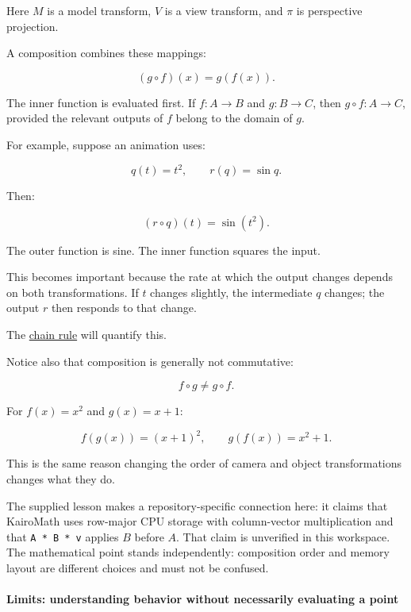 Here \(M\) is a model transform, \(V\) is a view transform, and \(\pi\) is perspective projection.

A composition combines these mappings:

\[
(g\circ f)(x)=g(f(x)).
\]

The inner function is evaluated first. If \(f:A\to B\) and \(g:B\to C\), then \(g\circ f:A\to C\), provided the relevant outputs of \(f\) belong to the domain of \(g\).

For example, suppose an animation uses:

\[
q(t)=t^2,\qquad r(q)=\sin q.
\]

Then:

\[
(r\circ q)(t)=\sin(t^2).
\]

The outer function is sine. The inner function squares the input.

This becomes important because the rate at which the output changes depends on both transformations. If \(t\) changes slightly, the intermediate \(q\) changes; the output \(r\) then responds to that change.

The \hyperref[01-foundations-i-ch020-functions-limits-continuity-and-scalar-change]{chain rule} will quantify this.

Notice also that composition is generally not commutative:

\[
f\circ g\ne g\circ f.
\]

For \(f(x)=x^2\) and \(g(x)=x+1\):

\[
f(g(x))=(x+1)^2, \qquad g(f(x))=x^2+1.
\]

This is the same reason changing the order of camera and object transformations changes what they do.

The supplied lesson makes a repository-specific connection here: it claims that KairoMath uses row-major CPU storage with column-vector multiplication and that \texttt{A\ *\ B\ *\ v} applies \(B\) before \(A\). That claim is unverified in this workspace. The mathematical point stands independently: composition order and memory layout are different choices and must not be confused.

\paragraph{Limits: understanding behavior without necessarily evaluating a point}\label{01-foundations-i-ch020-limits-understanding-behavior-without-necessarily-evaluating-a-point}

\hypertarget{01-foundations-i-ch020-limits-understanding-behavior-without-necessarily-evaluating-a-point}{}

